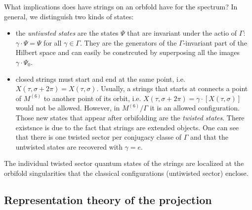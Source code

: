         What implications does have strings on an orbfold have for the spectrum? In general, we distinguish two kinds of states:
        \begin{itemize}
            \item the \emph{untiwsted states} are the states $\Psi$ that are invariant under the actio of $\Gamma$: $\gamma\cdot\Psi=\Psi$ for all $\gamma\in \Gamma$. They are the generators of the $\Gamma$-invariant part of the Hilbert space and can easily be constrcuted by superposing all the images $\gamma\cdot\Psi_0$.
            \item closed strings must start and end at the same point, i.e. $X(\tau,\sigma+2\pi)=X(\tau,\sigma)$. Usually, a strings that starts at connects a point of $M^{(6)}$ to another point of its orbit, i.e. $X(\tau,\sigma+2\pi)=\gamma\cdot[X(\tau,\sigma)]$ would not be allowed. However, in $M^{(6)}/\Gamma$ it is an allowed configuration. Those new states that appear after orbifolding are the \emph{twisted states}. There existsnce is due to the fact that strings are extended objects. One can see that there is one twisted sector per conjugacy classe of $\Gamma$ \marker and that the untwisted states are recovered with $\gamma=e$.
        \end{itemize}
        The individual twisted sector quantum states of the strings are localized at the orbifold singularities that the classical configurations (untiwisted sector) enclose.

    \subsection{Representation theory of the projection}

